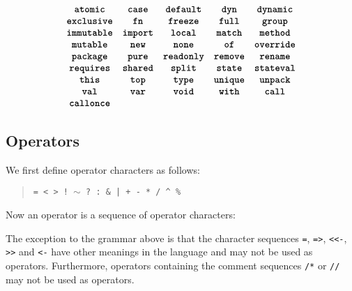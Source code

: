 \begin{quote}
 \oneof 
\end{quote}
\[
  \begin{array}{cccccc}
  \texttt{\textbf{atomic}}
  & \texttt{\textbf{case}} 
  & \texttt{\textbf{default}}
  & \texttt{\textbf{dyn}} 
  & \texttt{\textbf{dynamic}}
  \\
  \texttt{\textbf{exclusive}} 
  & \texttt{\textbf{fn}}
  & \texttt{\textbf{freeze}}
  & \texttt{\textbf{full}} 
  & \texttt{\textbf{group}}  
  \\
  \texttt{\textbf{immutable}}
  & \texttt{\textbf{import}}
  & \texttt{\textbf{local}}
  & \texttt{\textbf{match}}
  & \texttt{\textbf{method}}
  \\
  \texttt{\textbf{mutable}}
  &\texttt{\textbf{new}}
  & \texttt{\textbf{none}}
  & \texttt{\textbf{of}}
  & \texttt{\textbf{override}} 
  \\
  \texttt{\textbf{package}}
  & \texttt{\textbf{pure}}
  & \texttt{\textbf{readonly}}
  & \texttt{\textbf{remove}}
  & \texttt{\textbf{rename}}
  \\
  \texttt{\textbf{requires}}
  &\texttt{\textbf{shared}}
  & \texttt{\textbf{split}}  
  & \texttt{\textbf{state}}
  & \texttt{\textbf{stateval}}
  \\
   \texttt{\textbf{this}}
  & \texttt{\textbf{top}}
  & \texttt{\textbf{type}} 
  & \texttt{\textbf{unique}} 
  & \texttt{\textbf{unpack}}
  \\  \texttt{\textbf{val}}
  &\texttt{\textbf{var}}
  &\texttt{\textbf{void}}
  &\texttt{\textbf{with}}
  &\texttt{\textbf{call}}
  \\ \texttt{\textbf{callonce}}
  \end{array}
\]







\subsection{Operators}

We first define operator characters as follows:

\begin{quote}

 \oneof

 \texttt{= < > ! $\sim$ ? : \& | + - * / \^{} \%}

\end{quote}

Now an operator is a sequence of operator characters:

\begin{quote}


 {}

 {} 

\end{quote}

The exception to the grammar above is that the character sequences
\texttt{=}, \texttt{=>}, \texttt{<{}<-}, \texttt{>{}>} and \texttt{<-} have
other meanings in the language and may not be used as operators.
Furthermore, operators containing the comment sequences \texttt{/*}
or \texttt{//} may not be used as operators.
